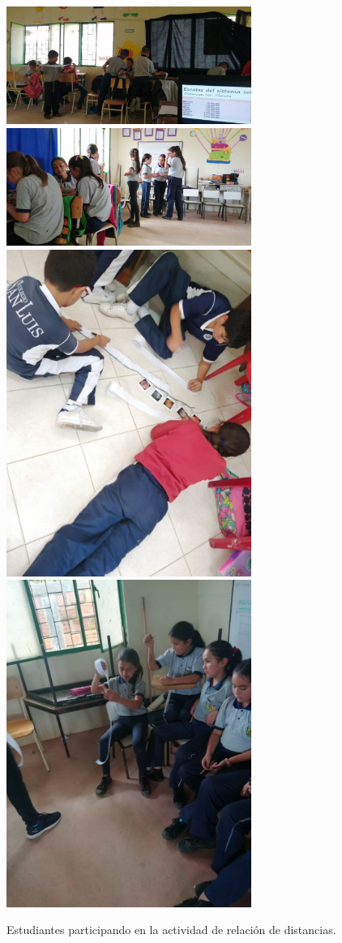 \documentclass[a4paper,10pt]{article}
\begin{document}
\begin{figure}[H]
    \centering
    \includegraphics[width=8cm]{clavellinas/clave.jpeg}
    \includegraphics[width=8cm]{clavellinas/clave1.jpeg}
    \includegraphics[width=8cm]{clavellinas/distancias-sanluis.jpeg}
    \includegraphics[width=8cm]{clavellinas/clavellinas-dist.jpeg}
    \caption{Estudiantes participando en la actividad de relación de distancias.}
\end{figure}
\end{document}

